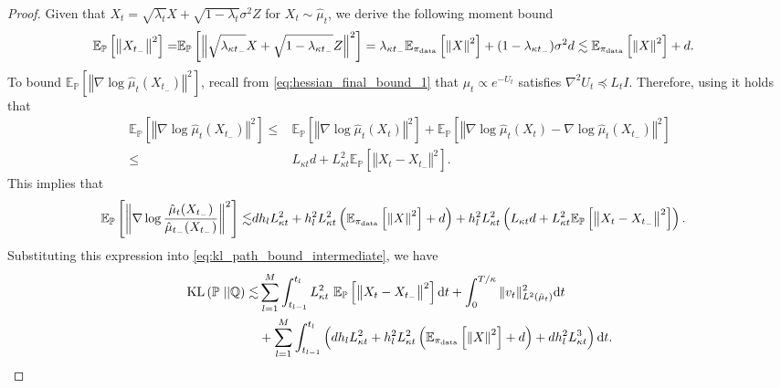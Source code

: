 \begin{proof}
Given that $X_t = \sqrt{\lambda_t} X + \sqrt{1-\lambda_t} \sigma^2 Z$ for $X_t\sim\hat{\mu}_t$, we derive the following moment bound
\begin{align*}
    \mathbb{E}_{\mathbb{P}}\left[\left\Vert X_{t_-}\right\Vert^2\right] =& \mathbb{E}_{\mathbb{P}}\left[\left\Vert \sqrt{\lambda_{\kappa t_-}} X + \sqrt{1-\lambda_{\kappa t_-}} Z\right\Vert^2\right] = \lambda_{\kappa t_-} \mathbb{E}_{\operatorname*{\pi_{\text{data}}}}\left[\left\Vert X\right\Vert^2\right] + (1-\lambda_{\kappa t_-})\sigma^2 d\lesssim \mathbb{E}_{\operatorname*{\pi_{\text{data}}}}\left[\left\Vert X\right\Vert^2\right] + d.
\end{align*}
To bound $\mathbb{E}_{\mathbb{P}}\left[\left\Vert \nabla\log\hat{\mu}_t(X_{t_-})\right\Vert^2\right]$, recall from \eqref{eq:hessian_final_bound_1} that $\mu_t\propto e^{-U_t}$ satisfies $\nabla^2 U_t \preccurlyeq  L_t I$. 
Therefore, using \citet[Lemma 4.0.1]{sinho_book} it holds that 
\begin{align*}
    \mathbb{E}_{\mathbb{P}}\left[\left\Vert \nabla\log\hat{\mu}_t(X_{t_-})\right\Vert^2\right] \leq & \mathbb{E}_{\mathbb{P}}\left[\left\Vert \nabla\log\hat{\mu}_t(X_{t})\right\Vert^2\right] + \mathbb{E}_{\mathbb{P}}\left[\left\Vert \nabla\log\hat{\mu}_t(X_{t})-\nabla\log\hat{\mu}_t(X_{t_-})\right\Vert^2\right]\\
    \leq & L_{\kappa t} d  + L_{\kappa t}^2\mathbb{E}_{\mathbb{P}} \left[\left\Vert X_t-X_{t_-}\right\Vert^2\right]. 
\end{align*}
This implies that
\begin{align*}
    \mathbb{E}_{\mathbb{P}} \left[\left\Vert \nabla\log \frac{\hat{\mu}_t(X_{t_-})}{\hat{\mu}_{t_-}(X_{t_-})}\right\Vert^2\right]\lesssim &d h_lL_{\kappa t}^2 + h_l^2L_{\kappa t}^2 \left(\mathbb{E}_{\operatorname*{\pi_{\text{data}}}}\left[\left\Vert X\right\Vert^2\right] + d\right) +  h_l^2L_{\kappa t}^2 \left(L_{\kappa t} d 
    + L_{\kappa t}^2\mathbb{E}_{\mathbb{P}} \left[\left\Vert X_t-X_{t_-}\right\Vert^2\right]\right).
\end{align*}
Substituting this expression into \eqref{eq:kl_path_bound_intermediate}, we have
\begin{align*}
    \kl\left(\mathbb{P}\;||\mathbb{Q}\right)\lesssim& \sum_{l=1}^M\int_{t_{l-1}}^{t_l} L_{\kappa t}^2 \ \mathbb{E}_{\mathbb{P}} \left[\left\Vert X_t-X_{t_-}\right\Vert^2\right]\md t+ \int_0^{T/\kappa} \Vert v_t\Vert^2_{L^2({\hat{\mu}}_t)} \md t\\
    &+ \sum_{l=1}^M\int_{t_{l-1}}^{t_l} \left(d h_l L_{\kappa t}^2 + h_l^2 L_{\kappa t}^2\left(\mathbb{E}_{\pid}\left[\left\Vert X\right\Vert^2\right] + d\right) +  dh_l^2 L_{\kappa t}^3\right)\md t.

\end{align*}
\end{proof}
